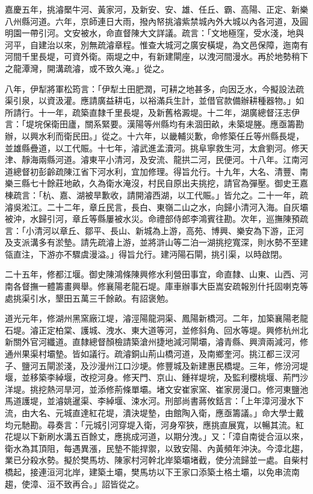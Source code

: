 \begin{pinyinscope}
嘉慶五年，挑濬檿牛河、黃家河，及新安、安、雄、任丘、霸、高陽、正定、新樂八州縣河道。六年，京師連日大雨，撥內帑挑濬紫禁城內外大城以內各河道，及圓明園一帶引河。文安被水，命直督陳大文詳議。疏言：「文地極窪，受水淺，地與河平，自建治以來，別無疏濬章程。惟查大城河之廣安橫堤，為文邑保障，迤南有河間千里長堤，可資外衛。兩堤之中，有新建閘座，以洩河間漫水。再於地勢稍下之龍潭灣，開溝疏濬，或不致久淹。」從之。

八年，伊犁將軍松筠言：「伊犁土田肥潤，可耕之地甚多，向因乏水，今擬設法疏渠引泉，以資汲灌。應請廣益耕屯，以裕滿兵生計，並借官款備辦耕種器物。」如所請行。十一年，疏築直隸千里長堤，及新舊格澱堤。十二年，湖廣總督汪志伊言：「堤垸保衛田廬，關系緊要。漢陽等州縣均有未涸田畝，未築堤塍。應亟籌勘辦，以興水利而衛民田。」從之。十六年，以畿輔災歉，命修築任丘等州縣長堤，並雄縣疊道，以工代賑。十七年，濬武進孟瀆河。挑阜寧救生河，太倉劉河。修天津、靜海兩縣河道。濬東平小清河，及安流、龍拱二河，民便河。十八年。江南河道總督初彭齡疏陳江省下河水利，宜加修理。得旨允行。十九年，大名、清豐、南樂三縣七十餘莊地畝，久為衛水淹沒，村民自原出夫挑挖，請官為彈壓。御史王嘉棟疏言：「杭、嘉、湖被旱歉收，請開濬西湖，以工代賑。」皆允之。二十一年，疏濬吳淞江。二十二年，章丘民言，長白、東嶺二山之水，向歸小清河入海。自灰壩被沖，水歸引河，章丘等縣屢被水災。命禮部侍郎李鴻賓往勘。次年，巡撫陳預疏言：「小清河以章丘、鄒平、長山、新城為上游，高苑、博興、樂安為下游，正河及支派溝多有淤墊。請先疏濬上游，並將滸山等二泊一湖挑挖寬深，則水勢不至建瓴直注，下游亦不驟虞漫溢。」得旨允行。建沔陽石閘，挑引渠，以時啟閉。

二十五年，修都江堰。御史陳鴻條陳興修水利營田事宜，命直隸、山東、山西、河南各督撫一體籌畫興舉。修襄陽老龍石堤。庫車辦事大臣嵩安疏報別什托固喇克等處挑渠引水，墾田五萬三千餘畝。有詔褒勉。

道光元年，修湖州黑窯廠江堤，濬涇陽龍洞渠、鳳陽新橋河。二年，加築襄陽老龍石堤。濬正定柏棠、護城、洩水、東大道等河，並修斜角、回水等堤。興修杭州北新關外官河纖道。直隸總督顏檢請築滄州捷地減河閘壩，濬青縣、興濟兩減河，修通州果渠村壩墊。皆如議行。疏濬銅山荊山橋河道，及南鄉奎河。挑江都三汊河子、鹽河五閘淤淺，及沙漫州江口沙埂。修豐城及新建惠民橋堤。三年，修汾河堤堰，並移築李綽堰，改挖河身。修天門、京山、鍾祥堤垸，及監利櫻桃堰、荊門沙洋堤。挑挖熱河旱河，並添修荊條單壩。堵文安崔家窯、崔家房漫口。修河東鹽池馬道護堤，並濬姚暹渠、李綽堰、涑水河。刑部尚書蔣攸銛言：「上年漳河漫水下流，由大名、元城直達紅花堤，潰決堤墊，由館陶入衛，應亟籌議。」命大學士戴均元馳勘。尋奏言：「元城引河穿堤入衛，河身窄狹，應挑直展寬，以暢其流。紅花堤以下新刷水溝五百餘丈，應挑成河道，以期分洩。」又：「漳自南徙合洹以來，衛水為其頂阻，每遇異漲，民墊不能捍禦，以致安陽、內黃頻年沖決。今漳北趨，業已分殺水勢。擬於樊馬坊、陳家村河幹北岸築壩堵截，使分流歸並一處。自柴村橋起，接連洹河北岸，建築土壩，樊馬坊以下王家口添築土格土壩，以免串流南趨，使漳、洹不致再合。」詔皆從之。


\end{pinyinscope}

